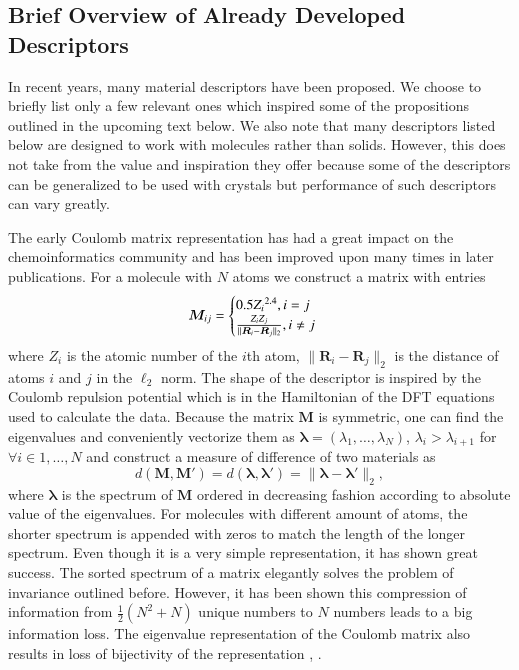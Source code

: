 \documentclass[11pt,oneside,czech,american]{book} %
\theoremstyle{definition} %
\theoremstyle{definition}
\begin{document}
\subsection{Brief Overview of Already Developed Descriptors} \label{developed}
In recent years, many material descriptors have been proposed. We choose to briefly list only a few relevant ones which inspired some of the propositions outlined in the upcoming text below. We also note that many descriptors listed below are designed to work with molecules rather than solids. However, this does not take from the value and inspiration they offer because some of the descriptors can be generalized to be used with crystals but performance of such descriptors can vary greatly.

The early Coulomb matrix representation \parencite{rupp12} has had a great impact on the chemoinformatics community and has been improved upon many times in later publications. For a molecule with $N$ atoms we construct a matrix with entries
\begin{equation}
	\bm{M}_{ij} =
	\begin{cases}
		0.5 {Z_{i}}^{2.4},\space i = j \\
		\frac{Z_i Z_j}{\|\boldsymbol{R}_i - \boldsymbol{R}_j\|_2}, \space i \neq j \\
	\end{cases}	
	\label{coulomb}
\end{equation}
where $Z_i$ is the atomic number of the $i$th atom, $\|\boldsymbol{R}_i - \boldsymbol{R}_j\|_2$ is the distance of atoms $i$ and $j$ in the $\ell_{2}$ norm. The shape of the descriptor is inspired by the Coulomb repulsion potential which is in the Hamiltonian of the DFT equations used to calculate the data. Because the matrix $\bm{M}$ is symmetric, one can find the eigenvalues and conveniently vectorize them as $\boldsymbol{\lambda} = (\lambda_1, \dots, \lambda_N)$, $\lambda_{i}>\lambda_{i+1}$ for $\forall i \in {1,\dots,N}$ and construct a measure of difference of two materials as 
\begin{equation}
	d(\bm{M}, \bm{M'}) = d(\boldsymbol{\lambda}, \boldsymbol{\lambda}') = \| \boldsymbol{\lambda} - \boldsymbol{\lambda}' \|_2,
\end{equation}
where $\boldsymbol{\lambda}$ is the spectrum of $\bm{M}$ ordered in decreasing fashion according to absolute value of the eigenvalues. For molecules with different amount of atoms, the shorter spectrum is appended with zeros to match the length of the longer spectrum. Even though it is a very simple representation, it has shown great success. The sorted spectrum of a matrix elegantly solves the problem of invariance outlined before. However, it has been shown \parencite{hansen13} this compression of information from $\frac{1}{2}(N^2 + N)$ unique numbers to $N$ numbers leads to a big information loss. The eigenvalue representation of the Coulomb matrix also results in loss of bijectivity of the representation \parencite{rup12answer}, \parencite{moussa12question}. 
\end{document}
